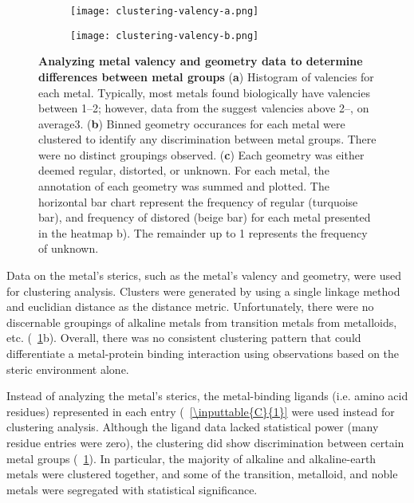 \documentclass[../main/main]{subfiles}
\begin{document}
\vspace*{\fill} %
\begin{figure}[H]
	\begin{subfigure}[h]{\textwidth}
		\centering
		\texttt{[image: clustering-valency-a.png]}
	\end{subfigure}
\end{figure}
%
\begin{figure}[H]\ContinuedFloat
	\begin{subfigure}[h]{\textwidth}
		\centering
		\texttt{[image: clustering-valency-b.png]}
	\end{subfigure}
	\caption[Analyzing metal valency and geometry data to determine differences between metal groups]
	{
		\textbf{Analyzing metal valency and geometry data to determine differences between metal groups}
		(\textbf{a}) Histogram of valencies for each metal. Typically, most metals found biologically have valencies between 1--2; however, data from the \mPDB{} suggest valencies above 2--, on average3.
		(\textbf{b}) Binned geometry occurances for each metal were clustered to identify any discrimination between metal groups. There were no distinct groupings observed.
		(\textbf{c}) Each geometry was either deemed regular, distorted, or unknown. For each metal, the annotation of each geometry was summed and plotted. The horizontal bar chart represent the frequency of regular (turquoise bar), and frequency of distored (beige bar) for each metal presented in the heatmap b). The remainder up to 1 represents the frequency of unknown.
	}
	\label{\figname{C}{5}}
\end{figure}

Data on the metal's sterics, such as the metal's valency and geometry, were used for clustering analysis. Clusters were generated by using a single linkage method and euclidian distance as the distance metric. Unfortunately, there were no discernable groupings of alkaline metals from transition metals from metalloids, etc. (\FIGURE~\ref{\figname{C}{5}}b). Overall, there was no consistent clustering pattern that could differentiate a metal-protein binding interaction using observations based on the steric environment alone.

Instead of analyzing the metal's sterics, the metal-binding ligands (i.e. amino acid residues) represented in each \mPDB{} entry (\TABLE~\ref{\inputtable{C}{1}} were used instead for clustering analysis. Although the ligand data lacked statistical power (many residue entries were zero), the clustering did show discrimination between certain metal groups (\FIGURE~\ref{\figname{C}{5}}). In particular, the majority of alkaline and alkaline-earth metals were clustered together, and some of the transition, metalloid, and noble metals were segregated with statistical significance.
\end{document}
